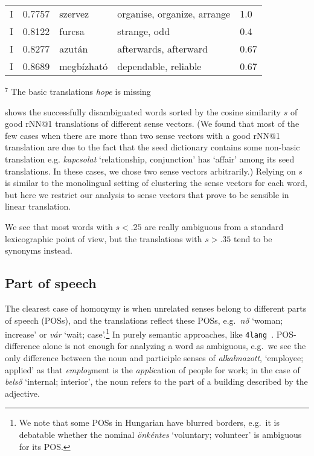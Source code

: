 \documentclass[11pt]{article}
\newcommand{\fl}{\texttt{4lang}}
\newcommand{\todo}[1]{}
\begin{document}
\begin{table*}
{\begin{tabular}{lllll}
    I	& 0.7757	& szervez	& organise, organize, arrange	& 1.0 \\
    I	& 0.8122	& furcsa	& strange, odd	& 0.4 \\
    I	& 0.8277	& azután	& afterwards, afterward	& 0.67 \\
    I	& 0.8689	& megbízható	& dependable, reliable	& 0.67 \\
    \bottomrule
  \end{tabular}
    }
  \caption{Hungarian words with the rNN@1 translations of their sense vectors.
  The first column is a post-hoc annotation by András Kornai (\emph E error in
  translation, \emph I identical, \emph S separate meanings), $s$ is the cosine
  similarity of the translations, and \emph{covg} denotes the coverage of the
  @1 translations over all gold translations.}
  \label{tab:alkoto} 
  {\footnotesize $^7$ The basic translations \emph{hope} is missing}
    \end{table*}

 shows the successfully disambiguated words sorted by the
cosine similarity $s$ of good rNN@1 translations of different sense vectors. (We
found that most of the few cases when there are more than two sense vectors
with a good rNN@1 translation are due to the fact that the seed dictionary
contains some non-basic translation e.g. \emph{kapcsolat} `relationship,
conjunction' has `affair' among its seed translations. In these cases, we chose
two sense vectors arbitrarily.\todo{When there are sense vectors with more than
two rNN@$k$ hits , the choice of the corresponding target words is also
arbitrary.})  Relying on $s$ is similar to the monolingual setting of
clustering the sense vectors for each word, but here we restrict our analysis
to sense vectors that prove to be sensible in linear translation.

We see that most words with $s<.25$ are really ambiguous from a standard
lexicographic point of view, but the translations with $s>.35$ tend to be
synonyms instead.


\subsection{Part of speech}

The clearest case of homonymy is when unrelated senses belong to different
parts of speech (POSs), and the translations reflect these POSs, e.g.~\emph{nő}
`woman; increase' or \emph{vár} \todo{update examples} `wait;
case'.\footnote{We note that some POSs in Hungarian have blurred borders,
e.g.~it is debatable whether the nominal \emph{önkéntes} `voluntary; volunteer'
is ambiguous for its POS.} In purely semantic approaches, like
\fl~\citep{Kornai:2018,Kornai:2015a}. POS-difference alone is not enough for
analyzing a word as ambiguous, e.g.~we see the only difference between the noun
and participle senses of \emph{alkalmazott}, `employee; applied' as that
\emph{employ}ment is the \emph{appli}cation of people for work; in the case of
\emph{belső} `internal; interior', the noun refers to the part of a building
described by the adjective.
\end{document}
